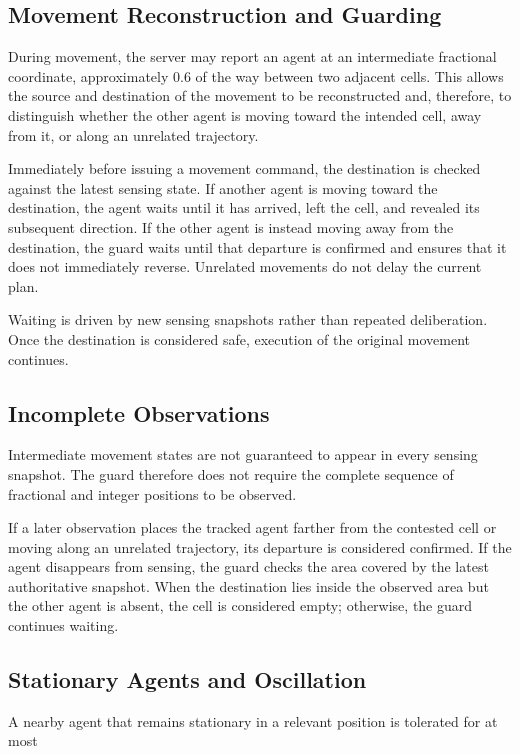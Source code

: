 \documentclass[a4paper]{article}
\begin{document}
\subsection{Movement Reconstruction and Guarding}

During movement, the server may report an agent at an intermediate fractional
coordinate, approximately $0.6$ of the way between two adjacent cells. This
allows the source and destination of the movement to be reconstructed and,
therefore, to distinguish whether the other agent is moving toward the intended
cell, away from it, or along an unrelated trajectory.

Immediately before issuing a movement command, the destination is checked
against the latest sensing state. If another agent is moving toward the
destination, the agent waits until it has arrived, left the cell, and revealed
its subsequent direction. If the other agent is instead moving away from the
destination, the guard waits until that departure is confirmed and ensures
that it does not immediately reverse. Unrelated movements do not delay the
current plan.

Waiting is driven by new sensing snapshots rather than repeated deliberation.
Once the destination is considered safe, execution of the original movement
continues.

\subsection{Incomplete Observations}

Intermediate movement states are not guaranteed to appear in every sensing
snapshot. The guard therefore does not require the complete sequence of
fractional and integer positions to be observed.

If a later observation places the tracked agent farther from the contested
cell or moving along an unrelated trajectory, its departure is considered
confirmed. If the agent disappears from sensing, the guard checks the area
covered by the latest authoritative snapshot. When the destination lies inside
the observed area but the other agent is absent, the cell is considered empty;
otherwise, the guard continues waiting.

\subsection{Stationary Agents and Oscillation}

A nearby agent that remains stationary in a relevant position is tolerated for
at most
\end{document}
